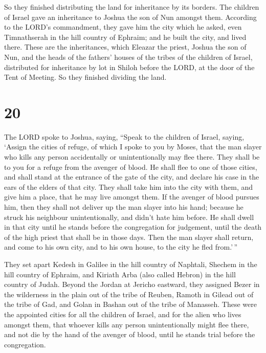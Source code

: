  So they finished distributing the land for inheritance by
its borders. The children of Israel gave an inheritance to Joshua the
son of Nun amongst them.  According to the LORD's
commandment, they gave him the city which he asked, even Timnathserah in
the hill country of Ephraim; and he built the city, and lived there.
 These are the inheritances, which Eleazar the priest,
Joshua the son of Nun, and the heads of the fathers' houses of the
tribes of the children of Israel, distributed for inheritance by lot in
Shiloh before the LORD, at the door of the Tent of Meeting. So they
finished dividing the land.

\hypertarget{section-19}{%
\section{20}\label{section-19}}

 The LORD spoke to Joshua, saying,  ``Speak to
the children of Israel, saying, `Assign the cities of refuge, of which I
spoke to you by Moses,  that the man slayer who kills any
person accidentally or unintentionally may flee there. They shall be to
you for a refuge from the avenger of blood.  He shall flee
to one of those cities, and shall stand at the entrance of the gate of
the city, and declare his case in the ears of the elders of that city.
They shall take him into the city with them, and give him a place, that
he may live amongst them.  If the avenger of blood pursues
him, then they shall not deliver up the man slayer into his hand;
because he struck his neighbour unintentionally, and didn't hate him
before.  He shall dwell in that city until he stands before
the congregation for judgement, until the death of the high priest that
shall be in those days. Then the man slayer shall return, and come to
his own city, and to his own house, to the city he fled from.'\,''

 They set apart Kedesh in Galilee in the hill country of
Naphtali, Shechem in the hill country of Ephraim, and Kiriath Arba (also
called Hebron) in the hill country of Judah.  Beyond the
Jordan at Jericho eastward, they assigned Bezer in the wilderness in the
plain out of the tribe of Reuben, Ramoth in Gilead out of the tribe of
Gad, and Golan in Bashan out of the tribe of Manasseh. 
These were the appointed cities for all the children of Israel, and for
the alien who lives amongst them, that whoever kills any person
unintentionally might flee there, and not die by the hand of the avenger
of blood, until he stands trial before the congregation.

